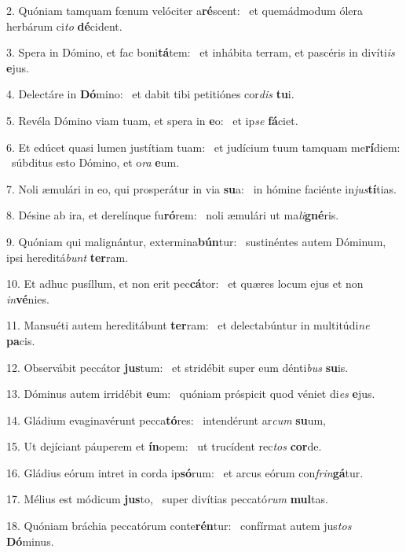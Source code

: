 2. Quóniam tamquam fœnum velóciter a\textbf{ré}scent: \ast\  et quemádmodum ólera herbárum ci\textit{to} \textbf{dé}cident.\

3. Spera in Dómino, et fac boni\textbf{tá}tem: \ast\  et inhábita terram, et pascéris in divíti\textit{is} \textbf{e}jus.\

4. Delectáre in \textbf{Dó}mino: \ast\  et dabit tibi petitiónes cor\textit{dis} \textbf{tu}i.\

5. Revéla Dómino viam tuam, et spera in \textbf{e}o: \ast\  et ip\textit{se} \textbf{fá}ciet.\

6. Et edúcet quasi lumen justítiam tuam: \dag\  et judícium tuum tamquam me\textbf{rí}diem: \ast\  súbditus esto Dómino, et o\textit{ra} \textbf{e}um.\

7. Noli æmulári in eo, qui prosperátur in via \textbf{su}a: \ast\  in hómine faciénte in\textit{jus}\textbf{tí}tias.\

8. Désine ab ira, et derelínque fu\textbf{ró}rem: \ast\  noli æmulári ut ma\textit{li}\textbf{gné}ris.\

9. Quóniam qui malignántur, extermina\textbf{bún}tur: \ast\  sustinéntes autem Dóminum, ipsi hereditá\textit{bunt} \textbf{ter}ram.\

10. Et adhuc pusíllum, et non erit pec\textbf{cá}tor: \ast\  et quæres locum ejus et non \textit{in}\textbf{vé}nies.\

11. Mansuéti autem hereditábunt \textbf{ter}ram: \ast\  et delectabúntur in multitúdi\textit{ne} \textbf{pa}cis.\

12. Observábit peccátor \textbf{jus}tum: \ast\  et stridébit super eum dénti\textit{bus} \textbf{su}is.\

13. Dóminus autem irridébit \textbf{e}um: \ast\  quóniam próspicit quod véniet di\textit{es} \textbf{e}jus.\

14. Gládium evaginavérunt pecca\textbf{tó}res: \ast\  intendérunt ar\textit{cum} \textbf{su}um,\

15. Ut dejíciant páuperem et \textbf{ín}opem: \ast\  ut trucídent rec\textit{tos} \textbf{cor}de.\

16. Gládius eórum intret in corda ip\textbf{só}rum: \ast\  et arcus eórum con\textit{frin}\textbf{gá}tur.\

17. Mélius est módicum \textbf{jus}to, \ast\  super divítias peccató\textit{rum} \textbf{mul}tas.\

18. Quóniam bráchia peccatórum conte\textbf{rén}tur: \ast\  confírmat autem jus\textit{tos} \textbf{Dó}minus.\

